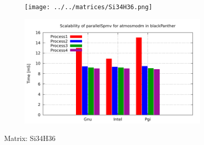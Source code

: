 \begin{figure} [ht!]
    \centering
    \captionsetup{justification=centering, singlelinecheck=false}
    \begin{subfigure}{.65\textwidth}
      \centering
      \hspace*{-3.5cm} 
      \texttt{[image: ../../matrices/Si34H36.png]}
      \label{fig:Si34H36_matrix}
    \end{subfigure}%
    \begin{subfigure}{.65\textwidth}
      \centering
      \hspace*{-6.0cm} 
      \includegraphics[page=7, width=0.95\linewidth]{../plots/blackPanther.pdf}
      \label{fig:Si34H36_performance}
    \end{subfigure}
\caption{Matrix: Si34H36}
\label{fig:Si34H36}
\end{figure}

